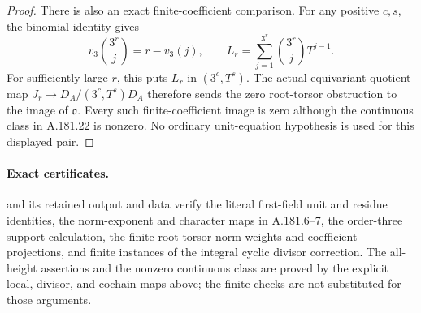 \begin{proof}
There is also an exact finite-coefficient comparison.
For any positive \(c,s\), the binomial identity gives
\[
 v_3\binom{3^r}{j}=r-v_3(j),\qquad
 L_r=\sum_{j=1}^{3^r}\binom{3^r}{j}T^{j-1}.
\tag{A.181.23}
\]
For sufficiently large \(r\), this puts
\(L_r\) in \((3^c,T^s)\).  The actual equivariant
quotient map
\(J_r\to D_A/(3^c,T^s)D_A\) therefore sends the
zero root-torsor obstruction to the image of
\(\mathfrak o\).  Every such finite-coefficient image
is zero although the continuous class in A.181.22 is
nonzero.  No ordinary unit-equation hypothesis is used
for this displayed pair.
\end{proof}

\paragraph{Exact certificates.}
and its retained output and data verify the literal first-field
unit and residue identities, the norm-exponent and character
maps in A.181.6--7, the order-three support calculation, the
finite root-torsor norm weights and coefficient projections,
and finite instances of the integral cyclic divisor correction.
The all-height assertions and the nonzero continuous class are
proved by the explicit local, divisor, and cochain maps above;
the finite checks are not substituted for those arguments.
